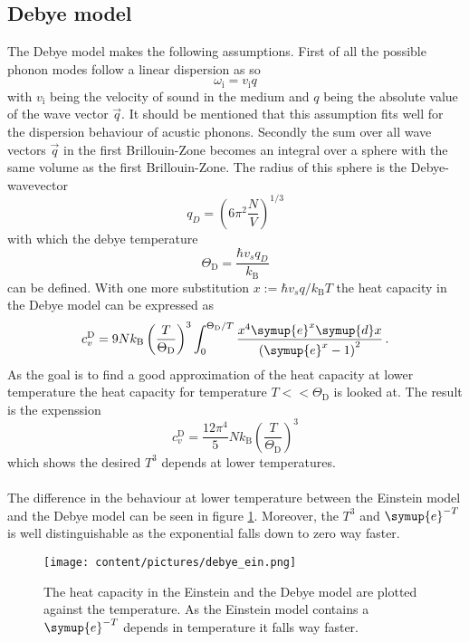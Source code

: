 \subsection{Debye model}
The Debye model makes the following assumptions.
First of all the possible phonon modes follow a linear dispersion as so 
\begin{equation*}
    \omega_\text{i} = v_\text{i} q
\end{equation*}
with $v_\text{i}$ being the velocity of sound in the medium and $q$ being the absolute value of the wave vector $\vec{q}$.
It should be mentioned that this assumption fits well for the dispersion behaviour of acustic phonons.
Secondly the sum over all wave vectors $\vec{q}$ in the first Brillouin-Zone becomes an integral over a sphere with the same volume as the first Brillouin-Zone.
The radius of this sphere is the Debye-wavevector 
\begin{equation*}
    q_D = \left ( 6 \pi^2 \frac{N}{V} \right )^{1/3}
\end{equation*}
with which the debye temperature
\begin{equation*}
    \Theta_\text{D} = \frac{\hbar v_s q_{D}}{k_\text{B}}
\end{equation*}
can be defined.
With one more substitution $x :=  \hbar v_s q / k_\text{B}T$ the heat capacity in the Debye model can be expressed as
\begin{equation*}
    c_v ^{\text{D}} = 9 N k_\text{B} \left (\frac{T}{\Theta_\text{D}} \right )^3 \int_0^{\Theta_\text{D}/T} \frac{x^4 \symup{e}^x \symup{d}x}{\left( \symup{e}^x - 1\right)^2} \, .
    \label{eq:heat_debye}
\end{equation*}
As the goal is to find a good approximation of the heat capacity at lower temperature the heat capacity for temperature $T<<\Theta_\text{D}$ is looked at.
The result is the expenssion
\begin{equation*}
    c_v ^{\text{D}} = \frac{12 \pi^4}{5} N k_\text{B} \left ( \frac{T}{\Theta_\text{D}} \right )^3
\end{equation*}
which shows the desired $T^3$ depends at lower temperatures.\\\\
The difference in the behaviour at lower temperature between the Einstein model and the Debye model can be seen in figure \ref{fig:ein_deb}.
Moreover, the $T^3$ and $\symup{e}^{-T}$ is well distinguishable as the exponential falls down to zero way faster.
\begin{figure}
    \centering
    \texttt{[image: content/pictures/debye\_ein.png]}
    \caption{The heat capacity in the Einstein and the Debye model are plotted against the temperature. As the Einstein model contains a $\symup{e}^{-T}$ depends in temperature it falls way faster.}
    \label{fig:ein_deb}
\end{figure}